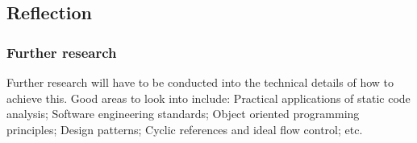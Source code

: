 \subsection{Reflection}

\subsubsection{Further research}
Further research will have to be conducted into the technical details of how to achieve this. Good areas to look into include: Practical applications of static code analysis; Software engineering standards; Object oriented programming principles; Design patterns; Cyclic references and ideal flow control; etc.